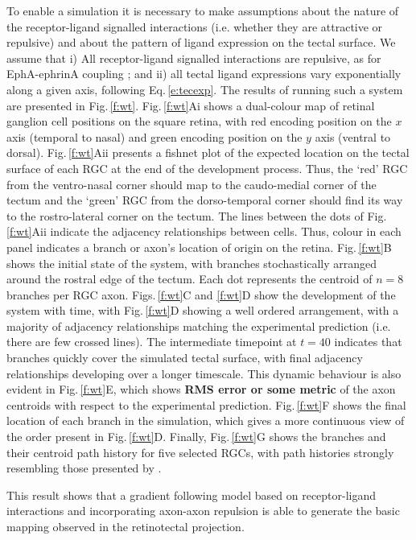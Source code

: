 \documentclass[11pt, a4paper]{article}
\begin{document}
To enable a simulation it is necessary to make assumptions about the nature of
the receptor-ligand signalled interactions (i.e. whether they are attractive
or repulsive) and about the pattern of ligand expression on the tectal
surface. We assume that i) All receptor-ligand signalled interactions are
repulsive, as for EphA-ephrinA
coupling \citep{drescher_vitro_1995,nakamoto_topographically_1996}; and ii)
all tectal ligand expressions vary exponentially along a given axis, following
Eq.\,\ref{e:tecexp}. The results of running such a system are presented in
Fig.\,\ref{f:wt}.
%
Fig.\,\ref{f:wt}Ai shows a dual-colour map of retinal ganglion cell positions
on the square retina, with red encoding position on the $x$ axis (temporal to
nasal) and green encoding position on the $y$ axis (ventral to
dorsal). Fig.\,\ref{f:wt}Aii presents a fishnet plot of the expected location on
the tectal surface of each RGC at the end of the development process. Thus,
the `red' RGC from the ventro-nasal corner should map to the caudo-medial
corner of the tectum and the `green' RGC from the dorso-temporal corner should
find its way to the rostro-lateral corner on the tectum. The lines between the
dots of Fig.\,\ref{f:wt}Aii indicate the adjacency relationships between
cells. Thus, colour in each panel indicates a branch or axon's location of
origin on the retina.
%
Fig.\,\ref{f:wt}B shows the initial state of the system, with branches
stochastically arranged around the rostral edge of the tectum. Each dot
represents the centroid of $n=8$ branches per RGC axon. Figs.\,\ref{f:wt}C and \ref{f:wt}D
show the development of the system with time, with Fig.\,\ref{f:wt}D showing a
well ordered arrangement, with a majority of adjacency relationships matching
the experimental prediction (i.e. there are few crossed lines). The
intermediate timepoint at $t=40$ indicates that branches quickly cover the simulated
tectal surface, with final adjacency relationships developing over a longer
timescale. This dynamic behaviour is also evident in Fig.\,\ref{f:wt}E, which
shows \textbf{RMS error or some metric} of the axon centroids with respect to
the experimental prediction. Fig.\,\ref{f:wt}F shows the final
location of each branch in the simulation, which gives a more continuous view
of the order present in Fig.\,\ref{f:wt}D. Finally, Fig.\,\ref{f:wt}G shows the
branches and their centroid path history for five selected RGCs, with path
histories strongly resembling those presented by \citet{simpson_simple_2011}.

This result shows that a gradient following model based on receptor-ligand
interactions and incorporating axon-axon repulsion is able to generate the
basic mapping observed in the retinotectal projection.
\end{document}
